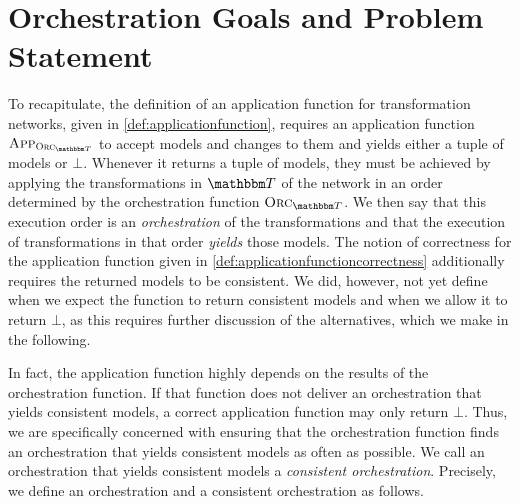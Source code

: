 \section{Orchestration Goals and Problem Statement} %

To recapitulate, the definition of an application function for transformation networks, given in \autoref{def:applicationfunction}, requires an application function $\appfunction{\orcfunction{\transformationset{T}}}$ to accept models and changes to them and yields either a tuple of models or $\bot$.
Whenever it returns a tuple of models, they must be achieved by applying the transformations in $\transformationset{T}$ of the network in an order determined by the orchestration function $\orcfunction{\transformationset{T}}$.
We then say that this execution order is an \emph{orchestration} of the transformations and that the execution of transformations in that order \emph{yields} those models.
The notion of correctness for the application function given in \autoref{def:applicationfunctioncorrectness} additionally requires the returned models to be consistent.
We did, however, not yet define when we expect the function to return consistent models and when we allow it to return $\bot$, as this requires further discussion of the alternatives, which we make in the following.

In fact, the application function highly depends on the results of the orchestration function.
If that function does not deliver an orchestration that yields consistent models, a correct application function may only return $\bot$.
Thus, we are specifically concerned with ensuring that the orchestration function finds an orchestration that yields consistent models as often as possible.
We call an orchestration that yields consistent models a \emph{consistent orchestration}.
Precisely, we define an orchestration and a consistent orchestration as follows.

